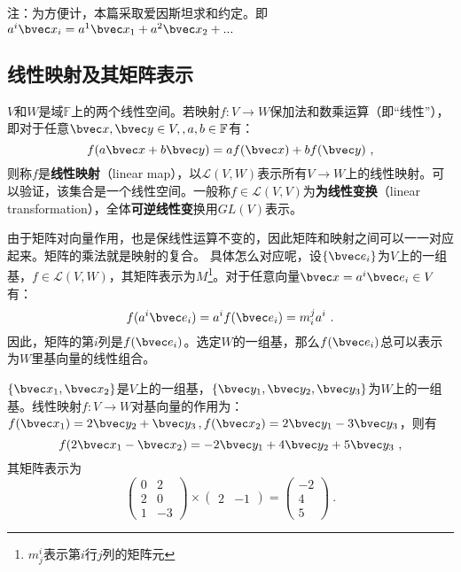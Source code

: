 

注：为方便计，本篇采取爱因斯坦求和约定。即$a^i\bvec x_i=a^1\bvec x_1+a^2\bvec x_2+...$
\subsection{线性映射及其矩阵表示}
$V$和$W$是域$\mathbb F$上的两个线性空间。若映射$f:V\rightarrow W$保加法和数乘运算（即“线性”），即对于任意$\bvec x,\bvec y \in V,,a,b\in\mathbb F$有：
\begin{equation}
f(a\bvec x+b\bvec y)=af(\bvec x)+bf(\bvec y)
~,\end{equation}
则称$f$是\textbf{线性映射}（linear map），以$\mathcal L(V,W)$表示所有$V\rightarrow W$上的线性映射。可以验证，该集合是一个线性空间。一般称$f\in \mathcal L(V,V)$为\textbf{为线性变换}（linear transformation），全体\textbf{可逆线性变}换用$GL(V)$表示。

由于矩阵对向量作用，也是保线性运算不变的，因此矩阵和映射之间可以一一对应起来。矩阵的乘法就是映射的复合。
具体怎么对应呢，设$\{\bvec e_i\}$为$V$上的一组基，$f\in\mathcal L(V,W)$，其矩阵表示为$M$\footnote{$m^i_j$表示第$i$行$j$列的矩阵元}。对于任意向量$\bvec x=a^i\bvec e_i\in V$有：
\begin{equation}
f(a^i\bvec e_i)=a^if(\bvec e_i)=m^j_i a^i~.
\end{equation}
因此，矩阵的第$i$列是$f(\bvec e_i)$。选定$W$的一组基，那么$f(\bvec e_i)$总可以表示为$W$里基向量的线性组合。
\begin{example}{}
$\{\bvec x_1,\bvec x_2\}$是$V$上的一组基，$\{\bvec y_1,\bvec y_2,\bvec y_3\}$为$W$上的一组基。线性映射$f:V\rightarrow W$对基向量的作用为：$f(\bvec x_1)=2\bvec y_2+\bvec y_3\,,f(\bvec x_2)=2\bvec y_1-3\bvec y_3$，则有
\begin{equation}
f(2\bvec  x_1-\bvec x_2)=-2\bvec y_1+4\bvec y_2+5\bvec y_3~,
\end{equation}其矩阵表示为
\begin{equation}
\begin{pmatrix}
  0& 2\\
  2& 0\\
 1 &-3
\end{pmatrix}\times \begin{pmatrix}
 2 &-1
\end{pmatrix}=\begin{pmatrix}
-2 \\
 4\\
5
\end{pmatrix}~.
\end{equation}
\end{example}
